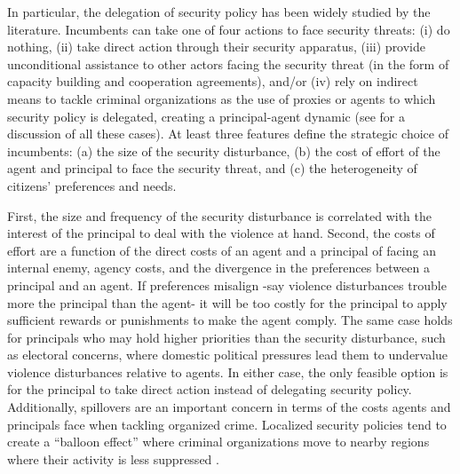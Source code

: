 \documentclass[12pt]{amsart}
\numberwithin{equation}{section}
\theoremstyle{definition}
\theoremstyle{definition}
\theoremstyle{definition}
\begin{document}
In particular, the delegation of security policy has been widely studied by the literature. Incumbents can take one of four actions to face security threats: (i) do nothing, (ii) take direct action through their security apparatus, (iii) provide unconditional assistance to other actors facing the security threat (in the form of capacity building and cooperation agreements), and/or (iv) rely on indirect means to tackle criminal organizations as the use of proxies or agents to which security policy is delegated, creating a principal-agent dynamic (see \citet{berman_lake_2019} for a discussion of all these cases). At least three features define the strategic choice of incumbents: (a) the size of the security disturbance, (b) the cost of effort of the agent and principal to face the security threat, and (c) the heterogeneity of citizens' preferences and needs. 

First, the size and frequency of the security disturbance is correlated with the interest of the principal to deal with the violence at hand. Second, the costs of effort are a function of the direct costs of an agent and a principal of facing an internal enemy, agency costs, and the divergence in the preferences between a principal and an agent. If preferences misalign -say violence disturbances trouble more the principal than the agent- it will be too costly for the principal to apply sufficient rewards or punishments to make the agent comply. The same case holds for principals who may hold higher priorities than the security disturbance, such as electoral concerns, where domestic political pressures lead them to undervalue violence disturbances relative to agents. In either case, the only feasible option is for the principal to take direct action instead of delegating security policy. Additionally, spillovers are an important concern in terms of the costs agents and principals face when tackling organized crime. Localized security policies tend to create a ``balloon effect'' where criminal organizations move to nearby regions where their activity is less suppressed \citep{shirk_wallman_2015}.
\end{document}
